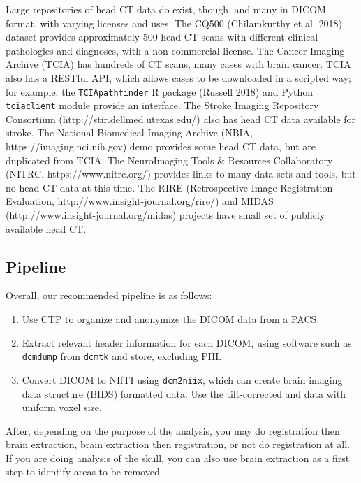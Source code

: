 \documentclass[]{elsarticle} %
\providecommand{\tightlist}{%
  \setlength{\itemsep}{0pt}\setlength{\parskip}{0pt}}
\begin{document}
Large repositories of head CT data do exist, though, and many in DICOM format, with varying licenses and uses. The CQ500 (Chilamkurthy et al. 2018) dataset provides approximately 500 head CT scans with different clinical pathologies and diagnoses, with a non-commercial license. The Cancer Imaging Archive (TCIA) has hundreds of CT scans, many cases with brain cancer. TCIA also has a RESTful API, which allows cases to be downloaded in a scripted way; for example, the \texttt{TCIApathfinder} R package (Russell 2018) and Python \texttt{tciaclient} module provide an interface. The Stroke Imaging Repository Consortium (http://stir.dellmed.utexas.edu/) also has head CT data available for stroke. The National Biomedical Imaging Archive (NBIA, https://imaging.nci.nih.gov) demo provides some head CT data, but are duplicated from TCIA. The NeuroImaging Tools \& Resources Collaboratory (NITRC, https://www.nitrc.org/) provides links to many data sets and tools, but no head CT data at this time. The RIRE (Retrospective Image Registration Evaluation, http://www.insight-journal.org/rire/) and MIDAS (http://www.insight-journal.org/midas) projects have small set of publicly available head CT.

\hypertarget{pipeline}{%
\subsection{Pipeline}\label{pipeline}}

Overall, our recommended pipeline is as follows:

\begin{enumerate}
\def\labelenumi{\arabic{enumi}.}
\tightlist
\item
  Use CTP to organize and anonymize the DICOM data from a PACS.
\item
  Extract relevant header information for each DICOM, using software such as \texttt{dcmdump} from \texttt{dcmtk} and store, excluding PHI.
\item
  Convert DICOM to NIfTI using \texttt{dcm2niix}, which can create brain imaging data structure (BIDS) formatted data. Use the tilt-corrected and data with uniform voxel size.
\end{enumerate}

After, depending on the purpose of the analysis, you may do registration then brain extraction, brain extraction then registration, or not do registration at all. If you are doing analysis of the skull, you can also use brain extraction as a first step to identify areas to be removed.
\end{document}
